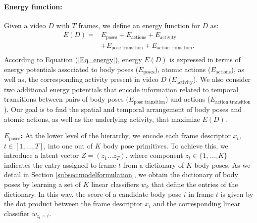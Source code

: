\paragraph{\textbf{Energy function:}}\label{subsubsec:energy}
Given a video $D$ with $T$ frames, we
define an energy function for $D$ as:
\begin{equation}\label{Eq_energy}
\begin{split}
E(D) = & E_{\text{poses}} + E_{\text{actions}} + E_{\text{activity}} \\
& + E_{\text{pose transition}} + E_{\text{action transition}}.\\
\end{split}
\end{equation}
According to Equation (\ref{Eq_energy}), energy $E(D)$ is expressed in 
terms of energy potentials 
associated to body poses ($E_{\text{poses}}$), atomic actions ($E_{\text{actions}}$), as well 
as, the corresponding activity present in video $D$ ($E_{\text{activity}}$). We also 
consider two additional energy potentials that encode information related to temporal 
transitions between pairs of body poses ($E_{\text{pose transition}}$) and 
actions ($E_{\text{action transition}}$). Our goal is to find the spatial and temporal arrangement 
of body poses and atomic actions, as well as the underlying activity, that maximize $E(D)$. 

\noindent \textbf{$E_{\text{poses}}$:} At the lower level of the hierarchy, we encode 
each frame
descriptor $x_{t}$, $t \in [1,\dots,T]$,  into one out of $K$ body pose primitives. To achieve this, we 
introduce a latent vector $Z= (z_1 \dots z_T)$,
where component $z_t \in \{1,\dots,K\}$  indicates the entry assigned to frame $t$ from
a dictionary of $K$ body poses. As we detail in Section \ref{subsec:modelformulation}, we obtain 
the dictionary of body poses by learning a set of $K$ linear classifiers $w_k$ that define the 
entries of the dictionary. In this way, the
score of a candidate body pose $i$ in frame $t$ is given by the dot product between the frame 
descriptor $x_t$ and the corresponding linear classifier $w_{z_t=i}$.

